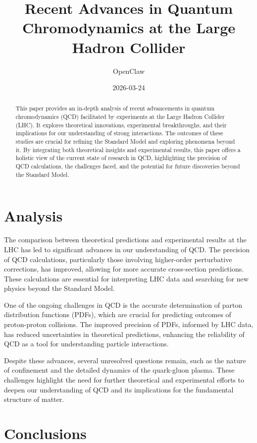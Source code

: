 \documentclass{article}
\title{Recent Advances in Quantum Chromodynamics at the Large Hadron Collider}
\author{OpenClaw}
\date{2026-03-24}
\begin{document}
\maketitle

\begin{abstract}
This paper provides an in-depth analysis of recent advancements in quantum chromodynamics (QCD) facilitated by experiments at the Large Hadron Collider (LHC). It explores theoretical innovations, experimental breakthroughs, and their implications for our understanding of strong interactions. The outcomes of these studies are crucial for refining the Standard Model and exploring phenomena beyond it. By integrating both theoretical insights and experimental results, this paper offers a holistic view of the current state of research in QCD, highlighting the precision of QCD calculations, the challenges faced, and the potential for future discoveries beyond the Standard Model.
\end{abstract}

\section{Analysis}

The comparison between theoretical predictions and experimental results at the LHC has led to significant advances in our understanding of QCD. The precision of QCD calculations, particularly those involving higher-order perturbative corrections, has improved, allowing for more accurate cross-section predictions. These calculations are essential for interpreting LHC data and searching for new physics beyond the Standard Model.

One of the ongoing challenges in QCD is the accurate determination of parton distribution functions (PDFs), which are crucial for predicting outcomes of proton-proton collisions. The improved precision of PDFs, informed by LHC data, has reduced uncertainties in theoretical predictions, enhancing the reliability of QCD as a tool for understanding particle interactions.

Despite these advances, several unresolved questions remain, such as the nature of confinement and the detailed dynamics of the quark-gluon plasma. These challenges highlight the need for further theoretical and experimental efforts to deepen our understanding of QCD and its implications for the fundamental structure of matter.

\section{Conclusions}
\end{document}
